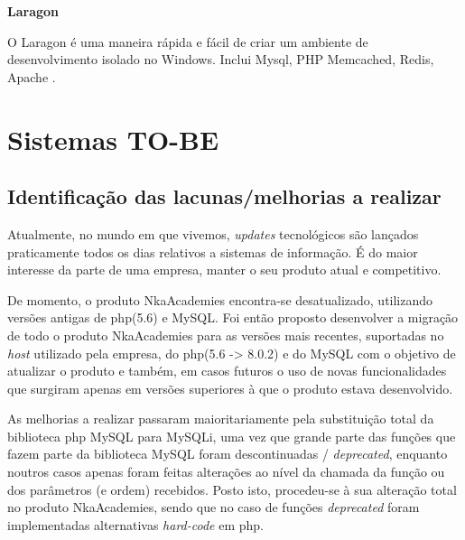 \textbf{Laragon}

O Laragon é uma maneira rápida e fácil de criar um ambiente de desenvolvimento isolado no Windows. Inclui Mysql, PHP Memcached, Redis, Apache \citep{laragon}.\newline

\section{Sistemas TO-BE}



\subsection{Identificação das lacunas/melhorias a realizar}


Atualmente, no mundo em que vivemos, \textit{updates} tecnológicos são lançados praticamente todos os dias relativos a sistemas de informação. É do maior interesse da parte de uma empresa, manter o seu produto atual e competitivo.

De momento, o produto NkaAcademies encontra-se desatualizado, utilizando versões antigas de \acrshort{php}(5.6) e MySQL. Foi então proposto desenvolver a migração de todo o produto NkaAcademies para as versões mais recentes, suportadas no \textit{host} utilizado pela empresa, do \acrshort{php}(5.6 -> 8.0.2) e do MySQL com o objetivo de atualizar o produto e também, em casos futuros o uso de novas funcionalidades que surgiram apenas em versões superiores à que o produto estava desenvolvido.

As melhorias a realizar passaram maioritariamente pela substituição total da biblioteca \acrshort{php} MySQL para MySQLi, uma vez que grande parte das funções que fazem parte da biblioteca MySQL foram descontinuadas / \textit{deprecated}, enquanto noutros casos apenas foram feitas alterações ao nível da chamada da função ou dos parâmetros (e ordem) recebidos. Posto isto, procedeu-se à sua alteração total no produto NkaAcademies, sendo que no caso de funções \textit{deprecated} foram implementadas alternativas \textit{hard-code} em \acrshort{php}.

